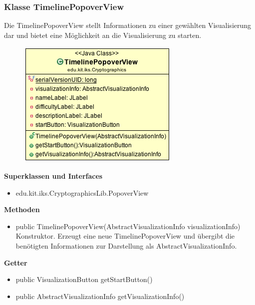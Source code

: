 \documentclass{article}
\begin{document}
    \subsubsection{Klasse TimelinePopoverView}
      Die TimelinePopoverView stellt Informationen zu einer gewählten Visualisierung dar und bietet eine Möglichkeit an die Visualisierung zu starten.
      \begin{figure}[H]
        \centering
        \includegraphics[width=\textwidth]{resources/edu-kit-iks-Cryptographics-TimelinePopoverView}
      \end{figure}

      \textbf{Superklassen und Interfaces}
      \begin{itemize}
        \item edu.kit.iks.CryptographicsLib.PopoverView
      \end{itemize}
      
      \textbf{Methoden}
      \begin{itemize}
        \item public TimelinePopoverView(AbstractVisualizationInfo visualizationInfo) \newline
        Konstruktor. Erzeugt eine neue TimelinePopoverView und übergibt die benötigten Informationen zur Darstellung als AbstractVisualizationInfo.
      \end{itemize}

      \textbf{Getter}
      \begin{itemize}
        \item public VisualizationButton getStartButton()
        \item public AbstractVisualizationInfo getVisualizationInfo()
      \end{itemize}
\end{document}
